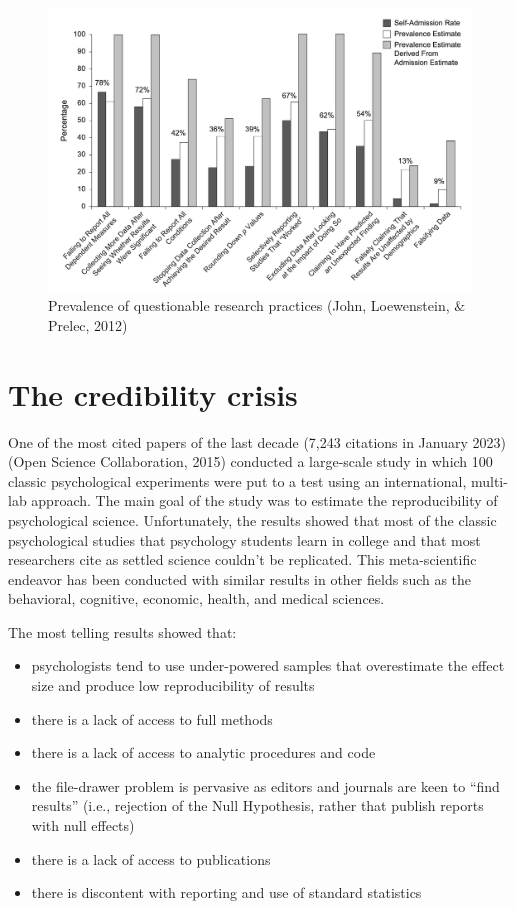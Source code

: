 \documentclass[
]{book}
\providecommand{\tightlist}{%
  \setlength{\itemsep}{0pt}\setlength{\parskip}{0pt}}
\theoremstyle{definition}
\theoremstyle{definition}
\theoremstyle{definition}
\theoremstyle{definition}
\theoremstyle{remark}
\begin{document}
\begin{figure}

{\centering \includegraphics[width=0.95\linewidth]{./images/pqrpractice} 

}

\caption{Prevalence of questionable research practices (John, Loewenstein, $\&$ Prelec, 2012)}\label{fig:questionable}
\end{figure}

\hypertarget{the-credibility-crisis}{%
\section{The credibility crisis}\label{the-credibility-crisis}}

One of the most cited papers of the last decade (7,243 citations in January 2023) (Open Science Collaboration, 2015) conducted a large-scale study in which 100 classic psychological experiments were put to a test using an international, multi-lab approach. The main goal of the study was to estimate the reproducibility of psychological science. Unfortunately, the results showed that most of the classic psychological studies that psychology students learn in college and that most researchers cite as settled science couldn't be replicated. This meta-scientific endeavor has been conducted with similar results in other fields such as the behavioral, cognitive, economic, health, and medical sciences.

The most telling results showed that:

\begin{itemize}
\tightlist
\item
  psychologists tend to use under-powered samples that overestimate the effect size and produce low reproducibility of results
\item
  there is a lack of access to full methods
\item
  there is a lack of access to analytic procedures and code
\item
  the file-drawer problem is pervasive as editors and journals are keen to ``find results'' (i.e., rejection of the Null Hypothesis, rather that publish reports with null effects)
\item
  there is a lack of access to publications
\item
  there is discontent with reporting and use of standard statistics
\end{itemize}
\end{document}
